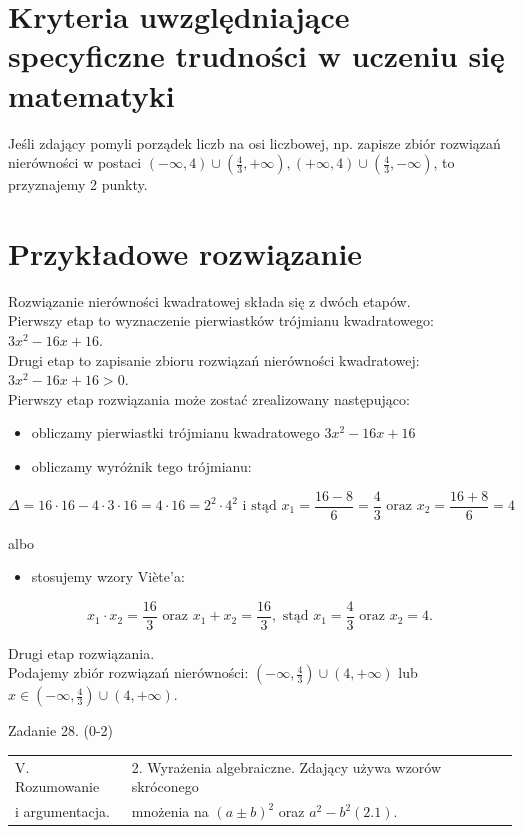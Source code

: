 \documentclass[10pt]{article}
\begin{document}
\section*{Kryteria uwzględniające specyficzne trudności w uczeniu się matematyki}
Jeśli zdający pomyli porządek liczb na osi liczbowej, np. zapisze zbiór rozwiązań nierówności w postaci $(-\infty, 4) \cup\left(\frac{4}{3},+\infty\right),(+\infty, 4) \cup\left(\frac{4}{3},-\infty\right)$, to przyznajemy 2 punkty.

\section*{Przykładowe rozwiązanie}
Rozwiązanie nierówności kwadratowej składa się z dwóch etapów.\\
Pierwszy etap to wyznaczenie pierwiastków trójmianu kwadratowego: $3 x^{2}-16 x+16$.\\
Drugi etap to zapisanie zbioru rozwiązań nierówności kwadratowej: $3 x^{2}-16 x+16>0$.\\
Pierwszy etap rozwiązania może zostać zrealizowany następująco:

\begin{itemize}
  \item obliczamy pierwiastki trójmianu kwadratowego $3 x^{2}-16 x+16$
  \item obliczamy wyróżnik tego trójmianu:
\end{itemize}

$$
\Delta=16 \cdot 16-4 \cdot 3 \cdot 16=4 \cdot 16=2^{2} \cdot 4^{2} \text { i stąd } x_{1}=\frac{16-8}{6}=\frac{4}{3} \text { oraz } x_{2}=\frac{16+8}{6}=4
$$

albo

\begin{itemize}
  \item stosujemy wzory Viète'a:
\end{itemize}

$$
x_{1} \cdot x_{2}=\frac{16}{3} \text { oraz } x_{1}+x_{2}=\frac{16}{3}, \text { stąd } x_{1}=\frac{4}{3} \text { oraz } x_{2}=4 .
$$

Drugi etap rozwiązania.\\
Podajemy zbiór rozwiązań nierówności: $\left(-\infty, \frac{4}{3}\right) \cup(4,+\infty)$ lub $x \in\left(-\infty, \frac{4}{3}\right) \cup(4,+\infty)$.

Zadanie 28. (0-2)

\begin{center}
\begin{tabular}{|l|l|}
\hline
V. Rozumowanie & 2. Wyrażenia algebraiczne. Zdający używa wzorów skróconego \\
i argumentacja. & mnożenia na $(a \pm b)^{2}$ oraz $a^{2}-b^{2}(2.1)$. \\
\end{tabular}
\end{center}
\end{document}
